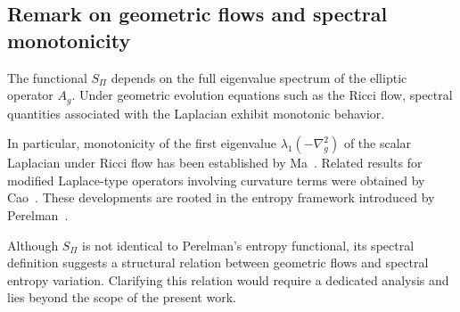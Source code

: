 \subsection{Remark on geometric flows and spectral monotonicity}
  \label{subsec:ricci-flow}

  The functional $S_\Pi$ depends on the full eigenvalue spectrum of the
  elliptic operator $A_g$.
  Under geometric evolution equations such as the Ricci flow,
  spectral quantities associated with the Laplacian exhibit
  monotonic behavior.

  In particular, monotonicity of the first eigenvalue
  $\lambda_1(-\nabla_g^2)$ of the scalar Laplacian under Ricci flow
  has been established by Ma~\cite{Ma2006}.
  Related results for modified Laplace-type operators involving
  curvature terms were obtained by Cao~\cite{Cao2007}.
  These developments are rooted in the entropy framework introduced
  by Perelman~\cite{Perelman2002}.

  Although $S_\Pi$ is not identical to Perelman's entropy functional,
  its spectral definition suggests a structural relation between
  geometric flows and spectral entropy variation.
  Clarifying this relation would require a dedicated analysis
  and lies beyond the scope of the present work.
